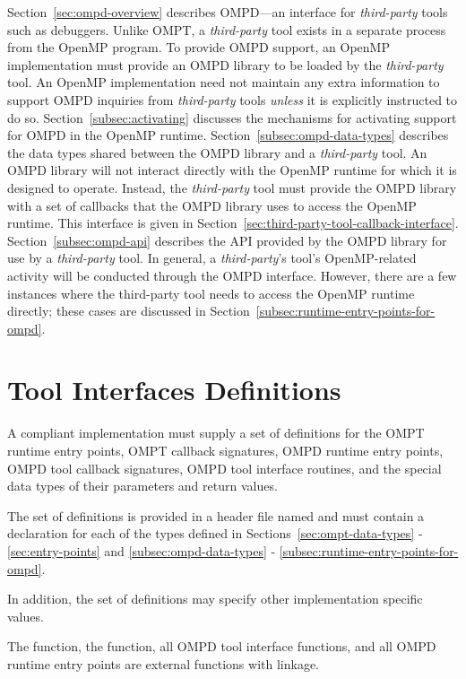 Section~\ref{sec:ompd-overview} describes
OMPD---an interface for  \emph{third-party} tools such as debuggers.
Unlike OMPT, a \emph{third-party} tool exists in a separate process from
the OpenMP program.
To provide OMPD support, an OpenMP implementation must provide an OMPD library to be 
loaded by the \emph{third-party} tool.
An OpenMP implementation need not maintain any extra information to support OMPD inquiries from \emph{third-party} tools
\emph{unless} it is explicitly instructed to do so.
Section~\ref{subsec:activating} discusses the mechanisms for
activating support for OMPD in the OpenMP runtime.
Section~\ref{subsec:ompd-data-types}  describes the data types shared between the OMPD library and a \emph{third-party} tool.
An OMPD library will not interact directly with the OpenMP
runtime for which it is designed to operate.
Instead, the \emph{third-party} tool must provide the OMPD library with a set of
callbacks that the OMPD library uses to access the OpenMP runtime.
This interface is given in
Section~\ref{sec:third-party-tool-callback-interface}.
Section~\ref{subsec:ompd-api} describes the API provided by 
the OMPD library for use by a \emph{third-party} tool.
In general, a \emph{third-party}'s tool's OpenMP-related activity will be
conducted through the OMPD interface.
However, there are a few instances where the third-party tool needs
to access the OpenMP runtime directly;
these cases are discussed in
Section~\ref{subsec:runtime-entry-points-for-ompd}.

\section{Tool Interfaces Definitions}
\label{sec:tool_interfaces_definitions}

\begin{ccppspecific}

A compliant implementation must supply a set of definitions for the OMPT runtime entry 
points, OMPT callback signatures, OMPD runtime entry points, OMPD tool callback 
signatures, OMPD tool interface routines, and the special data types of their parameters 
and return values.

The set of definitions is provided in a header file named  and must 
contain a declaration for each of the types defined in 
Sections~\ref{sec:ompt-data-types} - \ref{sec:entry-points} and
\ref{subsec:ompd-data-types} - \ref{subsec:runtime-entry-points-for-ompd}. 

In addition, the set of definitions may specify other implementation specific values.

The  function, the  function, all OMPD 
tool interface functions, and all OMPD runtime entry points are external functions with 
 linkage.
	
			
\end{ccppspecific}











